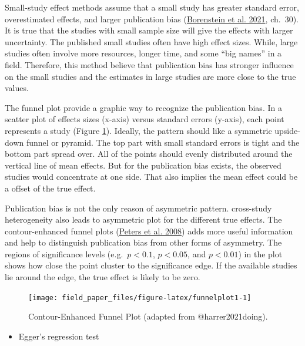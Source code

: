 \documentclass[
  11pt,
  openany]{memoir}
\providecommand{\tightlist}{%
  \setlength{\itemsep}{0pt}\setlength{\parskip}{0pt}}
\begin{document}
Small-study effect methods assume that a small study has greater standard error, overestimated effects, and larger publication bias (\protect\hyperlink{ref-borensteinIntroductionMetaAnalysis2021}{Borenstein et al. 2021}, ch.~30).
It is true that the studies with small sample size will give the effects with larger uncertainty.
The published small studies often have high effect sizes.
While, large studies often involve more resources, longer time, and some ``big names'' in a field.
Therefore, this method believe that publication bias has stronger influence on the small studies and the estimates in large studies are more close to the true values.

The funnel plot provide a graphic way to recognize the publication bias.
In a scatter plot of effects sizes (x-axis) versus standard errors (y-axis), each point represents a study (Figure \ref{fig:funnelplot1}).
Ideally, the pattern should like a symmetric upside-down funnel or pyramid.
The top part with small standard errors is tight and the bottom part spread over.
All of the points should evenly distributed around the vertical line of mean effects.
But for the publication bias exists, the observed studies would concentrate at one side.
That also implies the mean effect could be a offset of the true effect.

Publication bias is not the only reason of asymmetric pattern.
cross-study heterogeneity also leads to asymmetric plot for the different true effects.
The contour-enhanced funnel plots (\protect\hyperlink{ref-petersContourenhancedMetaanalysisFunnel2008}{Peters et al. 2008}) adds more useful information and help to distinguish publication bias from other forms of asymmetry.
The regions of significance levels (e.g.~\(p< 0.1\), \(p< 0.05\), and \(p< 0.01\)) in the plot shows how close the point cluster to the significance edge.
If the available studies lie around the edge, the true effect is likely to be zero.

\begin{figure}

{\centering \texttt{[image: field\_paper\_files/figure-latex/funnelplot1-1]} 

}

\caption{Contour-Enhanced Funnel Plot (adapted from @harrer2021doing).}\label{fig:funnelplot1}
\end{figure}

\begin{itemize}
\tightlist
\item
  Egger's regression test
\end{itemize}
\end{document}

